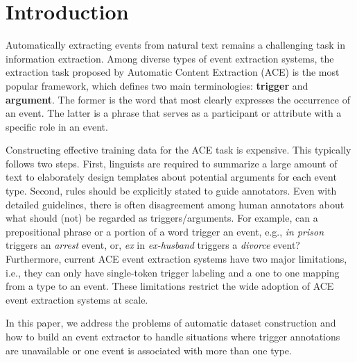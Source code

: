 \section{Introduction}
Automatically extracting events from natural text remains a challenging task in information extraction. Among diverse
types of event extraction systems, the extraction task proposed by Automatic Content Extraction (ACE)
\cite{doddington2004automatic} is the most popular framework, which defines two main terminologies: \textbf{trigger}
and \textbf{argument}. The former is the word that most clearly expresses the occurrence of an event. The latter is a
phrase that serves as a participant or attribute with a specific role in an event.

Constructing effective training data for the ACE task is expensive. This typically follows two steps. First, linguists
are required to summarize a large amount of text to elaborately design templates about potential arguments for each
event type. Second, rules should be explicitly stated to guide annotators. Even with detailed guidelines, there is
often disagreement among human annotators about what should (not) be regarded as triggers/arguments. For example, can a
prepositional phrase or a portion of a word trigger an event, e.g., \textit{in prison} triggers an \emph{arrest} event,
or, \textit{ex} in \textit{ex-husband} triggers a \emph{divorce} event?
Furthermore, current ACE event extraction systems have two major limitations, i.e., they can only have single-token trigger labeling and a one to one mapping from a type to an event. 
These limitations restrict the wide adoption of ACE event extraction systems at scale. 


In this paper, we address the problems of automatic dataset construction and how to build an event extractor to handle situations where 
trigger annotations are unavailable or one event is associated with more than one type. 


